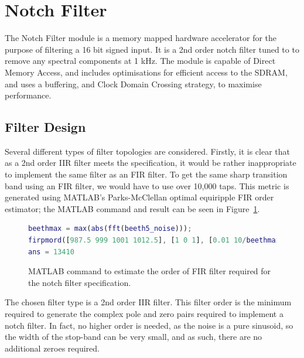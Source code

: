 \documentclass[]{article}
\begin{document}


\clearpage


\section{Notch Filter} %
\label{sec:notch_filter}

The Notch Filter module is a memory mapped hardware accelerator for the purpose of filtering a 16 bit signed input. It is a 2nd order notch filter tuned to to remove any spectral components at 1 kHz.
The module is capable of Direct Memory Access, and includes optimisations for efficient access to the SDRAM, and uses a buffering, and Clock Domain Crossing strategy, to maximise performance.

\subsection{Filter Design} %
\label{sub:filter_design}

Several different types of filter topologies are considered. Firstly, it is clear that as a 2nd order IIR filter meets the specification, it would be rather inappropriate to implement the same filter as an FIR filter. To get the same sharp transition band using an FIR filter, we would have to use over 10,000 taps. This metric is generated using MATLAB's Parks-McClellan optimal equiripple FIR order estimator; the MATLAB command and result can be seen in Figure~\ref{fig:firpmord}.

\begin{figure}[bp]
	\begin{center}
		\begin{lstlisting}[language = Matlab]
beethmax = max(abs(fft(beeth5_noise)));
firpmord([987.5 999 1001 1012.5], [1 0 1], [0.01 10/beethmax 0.01], 44100)
ans = 13410
		\end{lstlisting}
	\end{center}
	\caption{MATLAB command to estimate the order of FIR filter required for the notch filter specification.}
	\label{fig:firpmord}
\end{figure}

The chosen filter type is a 2nd order IIR filter. This filter order is the minimum required to generate the complex pole and zero pairs required to implement a notch filter. In fact, no higher order is needed, as the noise is a pure sinusoid, so the width of the stop-band can be very small, and as such, there are no additional zeroes required.
\end{document}

